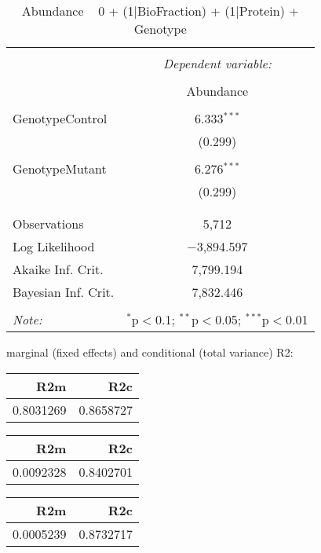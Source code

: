 \documentclass[11pt]{report}
\begin{document}
\begin{table}[!htbp] \centering 
  \caption{Abundance ~ 0 + (1|BioFraction) + (1|Protein) + Genotype} 
  \label{} 
\begin{tabular}{@{\extracolsep{5pt}}lc} 
\\[-1.8ex]\hline 
\hline \\[-1.8ex] 
 & \multicolumn{1}{c}{\textit{Dependent variable:}} \\ 
\cline{2-2} 
\\[-1.8ex] & Abundance \\ 
\hline \\[-1.8ex] 
 GenotypeControl & 6.333$^{***}$ \\ 
  & (0.299) \\ 
  & \\ 
 GenotypeMutant & 6.276$^{***}$ \\ 
  & (0.299) \\ 
  & \\ 
\hline \\[-1.8ex] 
Observations & 5,712 \\ 
Log Likelihood & $-$3,894.597 \\ 
Akaike Inf. Crit. & 7,799.194 \\ 
Bayesian Inf. Crit. & 7,832.446 \\ 
\hline 
\hline \\[-1.8ex] 
\textit{Note:}  & \multicolumn{1}{r}{$^{*}$p$<$0.1; $^{**}$p$<$0.05; $^{***}$p$<$0.01} \\ 
\end{tabular} 
\end{table} 
marginal (fixed effects) and conditional (total variance) R2:

\begin{tabular}{r|r}
\hline
R2m & R2c\\
\hline
0.8031269 & 0.8658727\\
\hline
\end{tabular}

\begin{tabular}{r|r}
\hline
R2m & R2c\\
\hline
0.0092328 & 0.8402701\\
\hline
\end{tabular}

\begin{tabular}{r|r}
\hline
R2m & R2c\\
\hline
0.0005239 & 0.8732717\\
\hline
\end{tabular}
\end{document}
